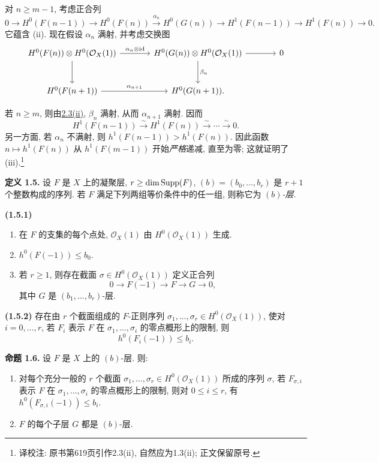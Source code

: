 对 \(n\geq m-1\), 考虑正合列
\[
  0\to H^0(F(n-1))\to H^0(F(n))
  \xrightarrow{\alpha_n}H^0(G(n))\to H^1(F(n-1))
  \to H^1(F(n))\to0.
\]
它蕴含 (ii). 现在假设 \(\alpha_n\) 满射, 并考虑交换图
\[
\begin{tikzcd}[column sep=large,row sep=large]
H^0(F(n))\otimes H^0(\mathcal O_X(1))
  \arrow[r,"\alpha_n\otimes\mathrm{id}"]
  \arrow[d]
& H^0(G(n))\otimes H^0(\mathcal O_X(1))
  \arrow[r]
  \arrow[d,"\beta_n"]
& 0 \\
H^0(F(n+1))
  \arrow[r,"\alpha_{n+1}"]
& H^0(G(n+1)).
\end{tikzcd}
\]

若 \(n\geq m\), 则由\hyperlink{sga6.e13.prop.1-3}{2.3(ii)}, \(\beta_n\) 满射, 从而 \(\alpha_{n+1}\) 满射. 因而
\[
  H^1(F(n-1))\xrightarrow{\sim}H^1(F(n))
  \xrightarrow{\sim}\cdots\xrightarrow{\sim}0.
\]
另一方面, 若 \(\alpha_n\) 不满射, 则 \(h^1(F(n-1))>h^1(F(n))\). 因此函数 \(n\longmapsto h^1(F(n))\) 从 \(h^1(F(m-1))\) 开始\emph{严格}递减, 直至为零; 这就证明了 (iii).\footnote{译校注: 原书第619页引作2.3(ii), 自然应为1.3(ii); 正文保留原号.}

\textbf{定义 1.5.} 设 \(F\) 是 \(X\) 上的凝聚层, \(r\geq\dim\operatorname{Supp}(F)\), \((b)=(b_0,\ldots,b_r)\) 是 \(r+1\) 个整数构成的序列. 若 \(F\) 满足下列两组等价条件中的任一组, 则称它为 \emph{\((b)\)-层}.

\noindent{}\textbf{(1.5.1)}
\begin{enumerate}[label=(\roman*)]
\item 在 \(F\) 的支集的每个点处, \(\mathcal O_X(1)\) 由 \(H^0(\mathcal O_X(1))\) 生成.
\item \(h^0(F(-1))\leq b_0\).
\item 若 \(r\geq1\), 则存在截面 \(\sigma\in H^0(\mathcal O_X(1))\) 定义正合列
\[
  0\longrightarrow F(-1)\longrightarrow F\longrightarrow G\longrightarrow0,
\]
其中 \(G\) 是 \((b_1,\ldots,b_r)\)-层.
\end{enumerate}

\noindent{}\textbf{(1.5.2)} 存在由 \(r\) 个截面组成的 \(F\)-正则序列 \(\sigma_1,\ldots,\sigma_r\in H^0(\mathcal O_X(1))\), 使对 \(i=0,\ldots,r\), 若 \(F_i\) 表示 \(F\) 在 \(\sigma_1,\ldots,\sigma_i\) 的零点概形上的限制, 则
\[
  h^0(F_i(-1))\leq b_i.
\]

\textbf{命题 1.6.} 设 \(F\) 是 \(X\) 上的 \((b)\)-层. 则:
\begin{enumerate}[label=(\roman*)]
\item 对每个充分一般的 \(r\) 个截面 \(\sigma_1,\ldots,\sigma_r\in H^0(\mathcal O_X(1))\) 所成的序列 \(\sigma\), 若 \(F_{\sigma,i}\) 表示 \(F\) 在 \(\sigma_1,\ldots,\sigma_i\) 的零点概形上的限制, 则对 \(0\leq i\leq r\), 有 \(h^0(F_{\sigma,i}(-1))\leq b_i\).
\item \(F\) 的每个子层 \(G\) 都是 \((b)\)-层.
\end{enumerate}

